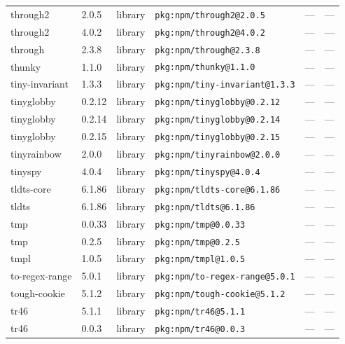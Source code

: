 \documentclass[11pt,a4paper]{article}
\begin{document}
\begin{longtable}{|p{4cm}|p{2cm}|p{1.6cm}|p{5cm}|p{1.5cm}|p{3.5cm}|}
\raggedright through2 & 2.0.5 & library & \small\texttt{pkg:npm/through2@2.0.5} & — & \small — \\
\raggedright through2 & 4.0.2 & library & \small\texttt{pkg:npm/through2@4.0.2} & — & \small — \\
\raggedright through & 2.3.8 & library & \small\texttt{pkg:npm/through@2.3.8} & — & \small — \\
\raggedright thunky & 1.1.0 & library & \small\texttt{pkg:npm/thunky@1.1.0} & — & \small — \\
\raggedright tiny-invariant & 1.3.3 & library & \small\texttt{pkg:npm/tiny-invariant@1.3.3} & — & \small — \\
\raggedright tinyglobby & 0.2.12 & library & \small\texttt{pkg:npm/tinyglobby@0.2.12} & — & \small — \\
\raggedright tinyglobby & 0.2.14 & library & \small\texttt{pkg:npm/tinyglobby@0.2.14} & — & \small — \\
\raggedright tinyglobby & 0.2.15 & library & \small\texttt{pkg:npm/tinyglobby@0.2.15} & — & \small — \\
\raggedright tinyrainbow & 2.0.0 & library & \small\texttt{pkg:npm/tinyrainbow@2.0.0} & — & \small — \\
\raggedright tinyspy & 4.0.4 & library & \small\texttt{pkg:npm/tinyspy@4.0.4} & — & \small — \\
\raggedright tldts-core & 6.1.86 & library & \small\texttt{pkg:npm/tldts-core@6.1.86} & — & \small — \\
\raggedright tldts & 6.1.86 & library & \small\texttt{pkg:npm/tldts@6.1.86} & — & \small — \\
\raggedright tmp & 0.0.33 & library & \small\texttt{pkg:npm/tmp@0.0.33} & — & \small — \\
\raggedright tmp & 0.2.5 & library & \small\texttt{pkg:npm/tmp@0.2.5} & — & \small — \\
\raggedright tmpl & 1.0.5 & library & \small\texttt{pkg:npm/tmpl@1.0.5} & — & \small — \\
\raggedright to-regex-range & 5.0.1 & library & \small\texttt{pkg:npm/to-regex-range@5.0.1} & — & \small — \\
\raggedright tough-cookie & 5.1.2 & library & \small\texttt{pkg:npm/tough-cookie@5.1.2} & — & \small — \\
\raggedright tr46 & 5.1.1 & library & \small\texttt{pkg:npm/tr46@5.1.1} & — & \small — \\
\raggedright tr46 & 0.0.3 & library & \small\texttt{pkg:npm/tr46@0.0.3} & — & \small — \\

\end{longtable}
\end{document}
